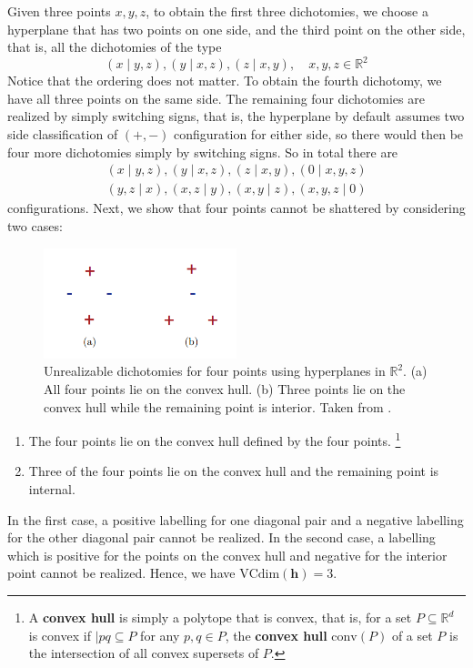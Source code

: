 \begin{example}[Hyperplane]
    Given three points $x,y,z$, to obtain the first three dichotomies, we choose a hyperplane that has two points on one side, and the third point on the other side, that is, all the dichotomies of the type 
    \begin{equation}
        (x\mid y,z), (y\mid x, z), (z\mid x,y), \quad x,y,z\in \mathbb{R}^{2}
    \end{equation}
    Notice that the ordering does not matter. To obtain the fourth dichotomy, we have all three points on the same side. The remaining four dichotomies are realized by simply switching signs, that is, the hyperplane by default assumes two side classification of $(+,-)$ configuration for either side, so there would then be four more dichotomies simply by switching signs. So in total there are 
    \begin{align}
        (x\mid y,z), (y\mid x, z), (z\mid x,y), (0\mid x,y,z)\\
        (y,z\mid x), (x,z\mid y), (x,y\mid z), (x,y,z\mid 0)
    \end{align}
    configurations. Next, we show that four points cannot be shattered by considering two cases: 
    \begin{figure}[h!]
    \centering
    \includegraphics[width=0.5\textwidth]{img/vc_dim_ex2.png}
    \caption{Unrealizable dichotomies for four points using hyperplanes in $\mathbb{R}^{2}$. (a) All four points lie on the convex hull. (b) Three points lie on the convex hull while the remaining point is interior. Taken from \cite{10.5555/2371238}.}
\end{figure}
    \begin{enumerate}[leftmargin=20pt, topsep=0.25pt,itemsep=0.1pt]
        \item[(1)] The four points lie on the convex hull defined by the four points. \footnote{A \textbf{convex hull} is simply a polytope that is convex, that is, for a set $P\subseteq \mathbb{R}^{d}$ is convex if $\lvert pq\subseteq P$ for any $p,q\in P$, the \textbf{convex hull} $\mathrm{conv}(P)$ of a set $P$ is the intersection of all convex supersets of $P$.}
        \item[(2)] Three of the four points lie on the convex hull and the remaining point is internal. 
    \end{enumerate}
    In the first case, a positive labelling for one diagonal pair and a negative labelling for the other diagonal pair cannot be realized. In the second case, a labelling which is positive for the points on the convex hull and negative for the interior point cannot be realized. Hence, we have $\mathrm{VCdim}(\mathbf{h})=3$. 
\end{example}

